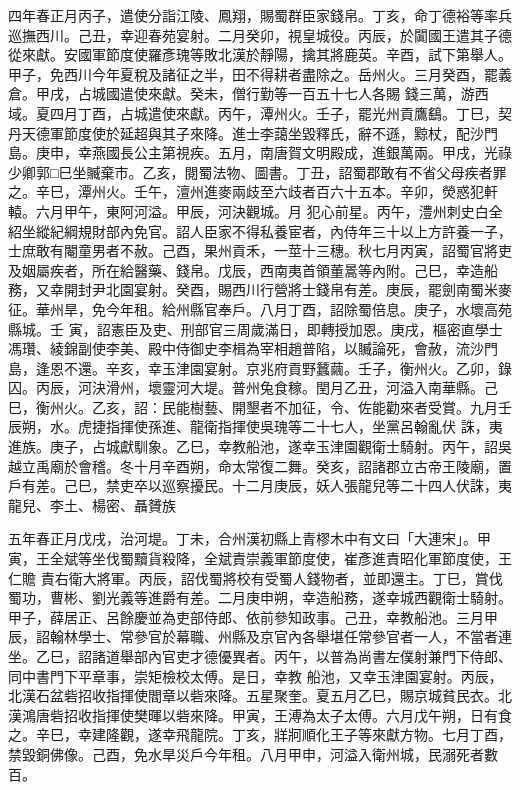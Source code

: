 \begin{pinyinscope}
 四年春正月丙子，遣使分詣江陵、鳳翔，賜蜀群臣家錢帛。丁亥，命丁德裕等率兵巡撫西川。己丑，幸迎春苑宴射。二月癸卯，視皇城役。丙辰，於闐國王遣其子德從來獻。安國軍節度使羅彥瑰等敗北漢於靜陽，擒其將鹿英。辛酉，試下第舉人。甲子，免西川今年夏稅及諸征之半，田不得耕者盡除之。岳州火。三月癸酉，罷義倉。甲戌，占城國遣使來獻。癸未，僧行勤等一百五十七人各賜
 錢三萬，游西域。夏四月丁酉，占城遣使來獻。丙午，潭州火。壬子，罷光州貢鷹鷂。丁巳，契丹天德軍節度使於延超與其子來降。進士李藹坐毀釋氏，辭不遜，黥杖，配沙門島。庚申，幸燕國長公主第視疾。五月，南唐賀文明殿成，進銀萬兩。甲戌，光祿少卿郭□巳坐贓棄市。乙亥，閱蜀法物、圖書。丁丑，詔蜀郡敢有不省父母疾者罪之。辛巳，潭州火。壬午，澶州進麥兩歧至六歧者百六十五本。辛卯，熒惑犯軒轅。六月甲午，東阿河溢。甲辰，河決觀城。月
 犯心前星。丙午，澧州刺史白全紹坐縱紀綱規財部內免官。詔人臣家不得私養宦者，內侍年三十以上方許養一子，士庶敢有閹童男者不赦。己酉，果州貢禾，一莖十三穗。秋七月丙寅，詔蜀官將吏及姻屬疾者，所在給醫藥、錢帛。戊辰，西南夷首領董暠等內附。己巳，幸造船務，又幸開封尹北園宴射。癸酉，賜西川行營將士錢帛有差。庚辰，罷劍南蜀米麥征。華州旱，免今年租。給州縣官奉戶。八月丁酉，詔除蜀倍息。庚子，水壞高苑縣城。壬
 寅，詔憲臣及吏、刑部官三周歲滿日，即轉授加恩。庚戌，樞密直學士馮瓚、綾錦副使李美、殿中侍御史李楫為宰相趙普陷，以贓論死，會赦，流沙門島，逢恩不還。辛亥，幸玉津園宴射。京兆府貢野蠶繭。壬子，衡州火。乙卯，錄囚。丙辰，河決滑州，壞靈河大堤。普州兔食稼。閏月乙丑，河溢入南華縣。己巳，衡州火。乙亥，詔：民能樹藝、開墾者不加征，令、佐能勸來者受賞。九月壬辰朔，水。虎捷指揮使孫進、龍衛指揮使吳瑰等二十七人，坐黨呂翰亂伏
 誅，夷進族。庚子，占城獻馴象。乙巳，幸教船池，遂幸玉津園觀衛士騎射。丙午，詔吳越立禹廟於會稽。冬十月辛酉朔，命太常復二舞。癸亥，詔諸郡立古帝王陵廟，置戶有差。己巳，禁吏卒以巡察擾民。十二月庚辰，妖人張龍兒等二十四人伏誅，夷龍兒、李土、楊密、聶贇族



 五年春正月戊戌，治河堤。丁未，合州漢初縣上青樛木中有文曰「大連宋」。甲寅，王全斌等坐伐蜀黷貨殺降，全斌責崇義軍節度使，崔彥進責昭化軍節度使，王仁贍
 責右衛大將軍。丙辰，詔伐蜀將校有受蜀人錢物者，並即還主。丁巳，賞伐蜀功，曹彬、劉光義等進爵有差。二月庚申朔，幸造船務，遂幸城西觀衛士騎射。甲子，薛居正、呂餘慶並為吏部侍郎、依前參知政事。己丑，幸教船池。三月甲辰，詔翰林學士、常參官於幕職、州縣及京官內各舉堪任常參官者一人，不當者連坐。乙巳，詔諸道舉部內官吏才德優異者。丙午，以普為尚書左僕射兼門下侍郎、同中書門下平章事，崇矩檢校太傅。是日，幸教
 船池，又幸玉津園宴射。丙辰，北漢石盆砦招收指揮使閻章以砦來降。五星聚奎。夏五月乙巳，賜京城貧民衣。北漢鴻唐砦招收指揮使樊暉以砦來降。甲寅，王溥為太子太傅。六月戊午朔，日有食之。辛巳，幸建隆觀，遂幸飛龍院。丁亥，牂牁順化王子等來獻方物。七月丁酉，禁毀銅佛像。己酉，免水旱災戶今年租。八月甲申，河溢入衛州城，民溺死者數百。




\end{pinyinscope}
